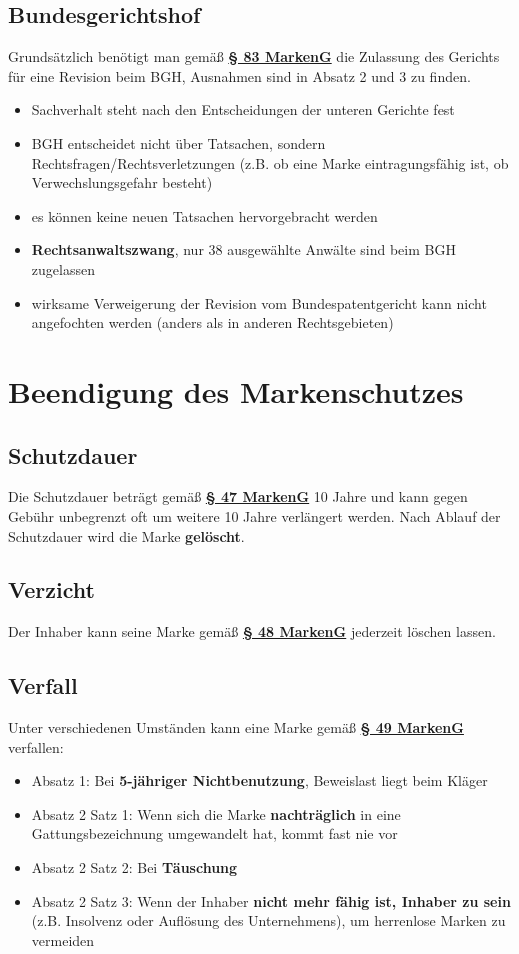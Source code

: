 \documentclass[12pt,A4]{extarticle}
\newcommand{\markenG}[2][]{\textbf{\textcolor{markenGesetzLink}{\href{https://www.gesetze-im-internet.de/markeng/__#2.html}{§ #2 \ifthenelse{\equal{#1}{}}{}{#1 }MarkenG}}}}
\begin{document}
\subsection{Bundesgerichtshof}
Grundsätzlich benötigt man gemäß \markenG[Abs. 1]{83} die Zulassung des Gerichts für eine Revision beim BGH, Ausnahmen sind in Absatz 2 und 3 zu finden.
\begin{itemize}
  \item{Sachverhalt steht nach den Entscheidungen der unteren Gerichte fest}
  \item{BGH entscheidet nicht über Tatsachen, sondern Rechtsfragen/Rechtsverletzungen (z.B. ob eine Marke eintragungsfähig ist, ob Verwechslungsgefahr besteht)}
  \item{es können keine neuen Tatsachen hervorgebracht werden}
  \item{\textbf{Rechtsanwaltszwang}, nur 38 ausgewählte Anwälte sind beim BGH zugelassen}
  \item{wirksame Verweigerung der Revision vom Bundespatentgericht kann nicht angefochten werden (anders als in anderen Rechtsgebieten)}
\end{itemize}

\section{Beendigung des Markenschutzes}
\subsection{Schutzdauer}
Die Schutzdauer beträgt gemäß \markenG[Abs. 1]{47} 10 Jahre und kann gegen Gebühr unbegrenzt oft um weitere 10 Jahre verlängert werden. Nach Ablauf der Schutzdauer wird die Marke \textbf{gelöscht}.

\subsection{Verzicht}
Der Inhaber kann seine Marke gemäß \markenG{48} jederzeit löschen lassen.

\subsection{Verfall}
Unter verschiedenen Umständen kann eine Marke gemäß \markenG{49} verfallen:
\begin{itemize}
  \item{Absatz 1: Bei \textbf{5-jähriger Nichtbenutzung}, Beweislast liegt beim Kläger}
  \item{Absatz 2 Satz 1: Wenn sich die Marke \textbf{nachträglich} in eine Gattungsbezeichnung umgewandelt hat, kommt fast nie vor}
  \item{Absatz 2 Satz 2: Bei \textbf{Täuschung}}
  \item{Absatz 2 Satz 3: Wenn der Inhaber \textbf{nicht mehr fähig ist, Inhaber zu sein} (z.B. Insolvenz oder Auflösung des Unternehmens), um herrenlose Marken zu vermeiden}
\end{itemize}
\end{document}
